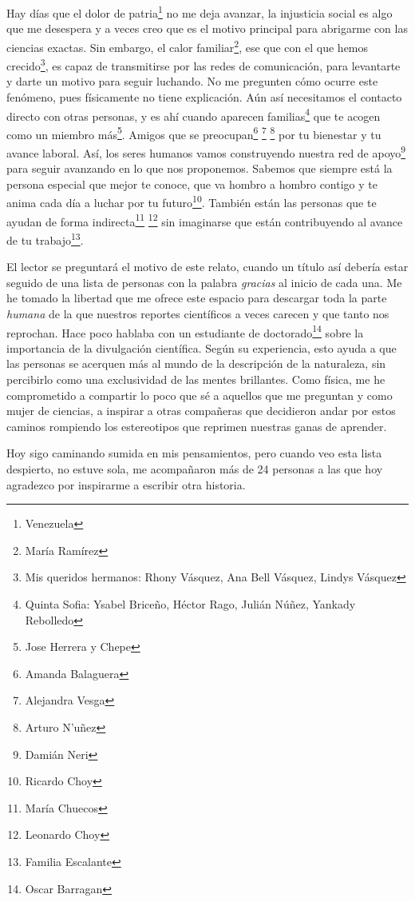 \documentclass[12pt,oneside,openany,letter]{book}
\begin{document}
Hay d\'ias que el dolor de patria\footnote{Venezuela} no me deja avanzar, la injusticia social es algo que me desespera y a veces creo que es el motivo principal para abrigarme con las ciencias exactas. Sin embargo, el calor familiar\footnote{Mar\'ia Ram\'irez}, ese que con el que hemos crecido\footnote{Mis queridos hermanos: Rhony V\'asquez, Ana Bell V\'asquez, Lindys V\'asquez}, es capaz de transmitirse por las redes de comunicaci\'on, para levantarte y darte un motivo para seguir luchando. No me pregunten c\'omo ocurre este fen\'omeno, pues f\'isicamente no tiene explicaci\'on. A\'un as\'i necesitamos el contacto directo con otras personas, y es ah\'i cuando aparecen familias\footnote{Quinta Sofia: Ysabel Brice\~no, H\'ector Rago, Juli\'an N\'u\~nez, Yankady Rebolledo} que te acogen como un miembro m\'as\footnote{Jose Herrera y Chepe}. Amigos que se preocupan\footnote{Amanda Balaguera} \footnote{Alejandra Vesga} \footnote{Arturo N'u\~nez} por tu bienestar y tu avance laboral. As\'i, los seres humanos vamos construyendo nuestra red de apoyo\footnote{Dami\'an Neri} para seguir avanzando en lo que nos proponemos. Sabemos que siempre est\'a la persona especial que mejor te conoce, que va hombro a hombro contigo y te anima cada d\'ia a luchar por tu futuro\footnote{Ricardo Choy}. Tambi\'en est\'an las personas que te ayudan de forma indirecta\footnote{Mar\'ia Chuecos} \footnote{Leonardo Choy} sin imaginarse que est\'an contribuyendo al avance de tu trabajo\footnote{Familia Escalante}.

El lector se preguntar\'a el motivo de este relato, cuando un t\'itulo as\'i deber\'ia estar seguido de una lista de personas con la palabra \textit{gracias} al inicio de cada una. Me he tomado la libertad que me ofrece este espacio para descargar toda la parte \textit{humana} de la que nuestros reportes cient\'ificos a veces carecen y que tanto nos reprochan. Hace poco hablaba con un estudiante de doctorado\footnote{Oscar Barragan} sobre la importancia de la divulgación científica. Según su experiencia, esto ayuda a que las personas se acerquen más al mundo de la descripción de la naturaleza, sin percibirlo como una exclusividad de las mentes brillantes. Como física, me he comprometido a compartir lo poco que sé a aquellos que me preguntan y como mujer de ciencias, a inspirar a otras compañeras que decidieron andar por estos caminos rompiendo los estereotipos que reprimen nuestras ganas de aprender.

Hoy sigo caminando sumida en mis pensamientos, pero cuando veo esta lista despierto, no estuve sola, me acompa\~naron m\'as de 24 personas a las que hoy agradezco por inspirarme a escribir otra historia. 
\end{document}
